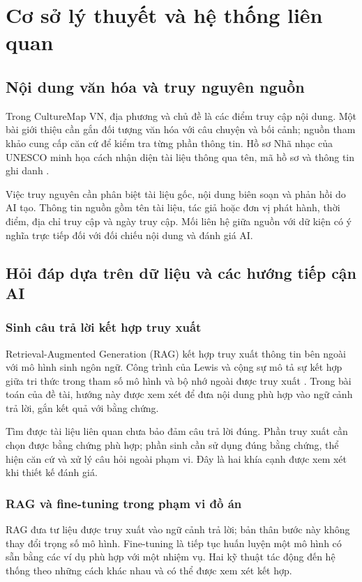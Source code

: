 \section{Cơ sở lý thuyết và hệ thống liên quan}
\label{sec:background}
\begingroup
\setlength{\parskip}{3.5pt}

\subsection{Nội dung văn hóa và truy nguyên nguồn}
Trong CultureMap VN, địa phương và chủ đề là các điểm truy cập nội dung.
Một bài giới thiệu cần gắn đối tượng văn hóa với câu chuyện và bối cảnh;
nguồn tham khảo cung cấp căn cứ để kiểm tra từng phần thông tin.
Hồ sơ Nhã nhạc của UNESCO minh họa cách nhận diện tài liệu thông qua tên,
mã hồ sơ và thông tin ghi danh \cite{unesco-nhanhac}.

Việc truy nguyên cần phân biệt tài liệu gốc, nội dung biên soạn và phản
hồi do AI tạo. Thông tin nguồn gồm tên tài liệu, tác giả hoặc đơn vị phát
hành, thời điểm, địa chỉ truy cập và ngày truy cập. Mối liên hệ giữa nguồn
với dữ kiện có ý nghĩa trực tiếp đối với đối chiếu nội dung và đánh giá AI.

\subsection{Hỏi đáp dựa trên dữ liệu và các hướng tiếp cận AI}
\subsubsection{Sinh câu trả lời kết hợp truy xuất}
Retrieval-Augmented Generation (RAG) kết hợp truy xuất thông tin bên ngoài
với mô hình sinh ngôn ngữ. Công trình của Lewis và cộng sự mô tả sự kết
hợp giữa tri thức trong tham số mô hình và bộ nhớ ngoài được truy xuất
\cite{lewis-rag}. Trong bài toán của đề tài, hướng này được xem xét để đưa
nội dung phù hợp vào ngữ cảnh trả lời, gắn kết quả với bằng chứng.

Tìm được tài liệu liên quan chưa bảo đảm câu trả lời đúng. Phần truy xuất
cần chọn được bằng chứng phù hợp; phần sinh cần sử dụng đúng bằng chứng,
thể hiện căn cứ và xử lý câu hỏi ngoài phạm vi. Đây là hai khía cạnh
được xem xét khi thiết kế đánh giá.

\subsubsection{RAG và fine-tuning trong phạm vi đồ án}
RAG đưa tư liệu được truy xuất vào ngữ cảnh trả lời; bản thân bước này
không thay đổi trọng số mô hình. Fine-tuning là tiếp tục huấn luyện một
mô hình có sẵn bằng các ví dụ phù hợp với một nhiệm vụ. Hai kỹ thuật tác
động đến hệ thống theo những cách khác nhau và có thể được xem xét kết hợp.

